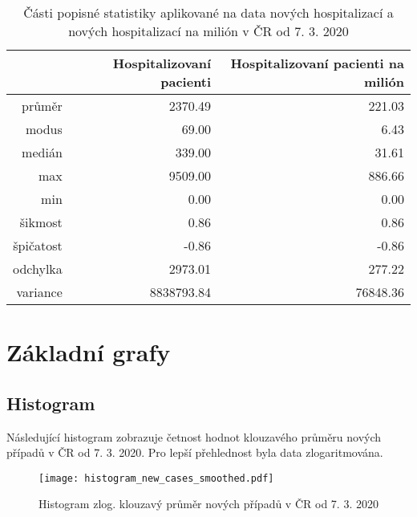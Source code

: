\documentclass[a4paper, 12pt]{article}
\begin{document}
\begin{table}[ht]
\centering
\begin{tabular}{rrr}
  \hline
 & Hospitalizovaní pacienti & Hospitalizovaní pacienti na milión \\ 
  \hline
průměr & 2370.49 & 221.03 \\ 
  modus & 69.00 & 6.43 \\ 
  medián & 339.00 & 31.61 \\ 
  max & 9509.00 & 886.66 \\ 
  min & 0.00 & 0.00 \\ 
  šikmost & 0.86 & 0.86 \\ 
  špičatost & -0.86 & -0.86 \\ 
  odchylka & 2973.01 & 277.22 \\ 
  variance & 8838793.84 & 76848.36 \\ 
   \hline
\end{tabular}
\caption{Části popisné statistiky aplikované na data nových hospitalizací a nových hospitalizací na milión v ČR od 7. 3. 2020} 
\label{table:popisStat}
\end{table}


\section{Základní grafy}
\subsection{Histogram}

Následující histogram zobrazuje četnost hodnot klouzavého průměru nových případů v ČR od 7. 3. 2020.
Pro lepší přehlednost byla data zlogaritmována.

\begin{figure}[H]
\centering
\texttt{[image: histogram\_new\_cases\_smoothed.pdf]}
\caption{Histogram zlog. klouzavý průměr nových případů v ČR od 7. 3. 2020}
\end{figure}
\end{document}
